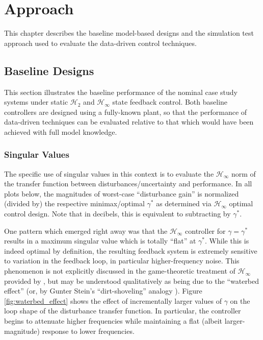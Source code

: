 \chapter{Approach}
\label{chap:approach}
This chapter describes the baseline model-based designs and the simulation test approach used to evaluate the data-driven control techniques.

\section{Baseline Designs}
\label{sect:results:baseline}
This section illustrates the baseline performance of the nominal case study systems under static $\mathcal{H}_{2}$ and $\mathcal{H}_{\infty}$ state feedback control.  Both baseline controllers are designed using a fully-known plant, so that the performance of data-driven techniques can be evaluated relative to that which would have been achieved with full model knowledge.

\subsection{Singular Values}
The specific use of singular values in this context is to evaluate the $\mathcal{H}_{\infty}$ norm of the transfer function between disturbances/uncertainty and performance.  In all plots below, the magnitudes of worst-case ``disturbance gain'' is normalized (divided by) the respective minimax/optimal $\gamma^{*}$ as determined via $\mathcal{H}_{\infty}$ optimal control design.  Note that in decibels, this is equivalent to subtracting by $\gamma^{*}$.

One pattern which emerged right away was that the $\mathcal{H}_{\infty}$ controller for $\gamma = \gamma^{*}$ results in a maximum singular value which is totally ``flat'' at $\gamma^{*}$.  While this is indeed optimal by definition, the resulting feedback system is extremely sensitive to variation in the feedback loop, in particular higher-frequency noise.  This phenomenon is not explicitly discussed in the game-theoretic treatment of $\mathcal{H}_{\infty}$ provided by \cite{bacsar2008h}, but may be understood qualitatively as being due to the ``waterbed effect'' (or, by Gunter Stein's ``dirt-shoveling'' analogy \cite{stein2003respect}).  Figure \ref{fig:waterbed_effect} shows the effect of incrementally larger values of $\gamma$ on the loop shape of the disturbance transfer function.  In particular, the controller begins to attenuate higher frequencies while maintaining a flat (albeit larger-magnitude) response to lower frequencies.

